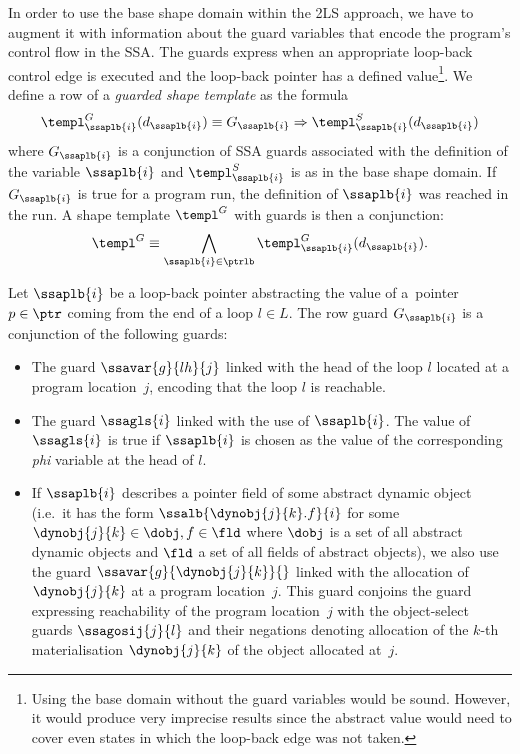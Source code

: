 {In order to use the base shape domain within the 2LS approach, we have to augment it
with information about the guard variables that encode the program's control
flow in the SSA. The guards express when an appropriate loop-back control edge
is executed and the loop-back pointer has a defined value\footnote{Using the base domain without the guard variables would be sound. However, it
would produce very imprecise results since the abstract value would
need to cover even states in which the loop-back edge was not taken.}.
%
We define a row of a \emph{guarded shape template}
as the formula
\begin{equation}\label{eq:templ_row_guard}
\begin{split}
\templ^G_{\ssaplb{i}}(d_{\ssaplb{i}}) \equiv G_{\ssaplb{i}}
\Rightarrow \templ^S_{\ssaplb{i}}(d_{\ssaplb{i}})
\end{split}
\end{equation}
where $G_{\ssaplb{i}}$ is a conjunction of SSA guards associated with the definition of the variable
$\ssaplb{i}$ and $\templ^S_{\ssaplb{i}}$ is as in the base shape domain.
%
If $G_{\ssaplb{i}}$ is true for a program run, the definition of $\ssaplb{i}$
was reached in the run.
%
A shape template $\templ^G$ with guards is then a conjunction:
\begin{equation}\label{eq:templ_guard}
\begin{split}
\templ^G \equiv \bigwedge_{\ssaplb{i} \in \ptrlb}
\templ^G_{\ssaplb{i}}(d_{\ssaplb{i}}).
\end{split}
\end{equation}

Let $\ssaplb{i}$ be a loop-back pointer abstracting the value of a~pointer $p
\in \ptr$ coming from the end of a loop $l \in L$. 
%
The row guard $G_{\ssaplb{i}}$ is a conjunction of the following guards:
\begin{itemize} 

  \item The guard $\ssavar{g}{lh}{j}$ linked with the head of the loop
    $l$ located at a program location~$j$, encoding that the
    loop $l$ is reachable.

  \item The guard $\ssagls{i}$ linked with the use of $\ssaplb{i}$. The value of
  $\ssagls{i}$ is true if $\ssaplb{i}$ is chosen as the value of the
  corresponding \emph{phi} variable at the head of $l$.

  \item If $\ssaplb{i}$ describes a pointer field of some abstract
    dynamic object (i.e.\ it has the form $\ssalb{\dynobj{j}{k}.f}{i}$
    for some $\dynobj{j}{k} \in \dobj, f \in \fld$ where $\dobj$ is a set of all abstract dynamic objects
    and $\fld$ a set of all fields of abstract objects), we also use the
    guard $\ssavar{g}{\dynobj{j}{k}}{}$ linked with the allocation of
    $\dynobj{j}{k}$ at a program location~$j$. This guard conjoins the
    guard expressing reachability of the program location~$j$ with the
    object-select guards $\ssagosij{j}{l}$ and their negations
    denoting allocation of the $k$-th materialisation $\dynobj{j}{k}$ of the
    object allocated at~$j$.
\end{itemize}

}
